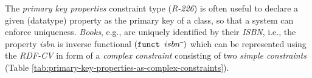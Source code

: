 \documentclass[a4paper,fontsize=11pt]{scrartcl}
\newcommand{\ms}[1]{\texttt{#1}}
\begin{document}
%
%
%
The \emph{primary key properties} constraint type (\emph{R-226}) is often useful to declare a given (datatype) property as the primary key of a class, so that a system can enforce uniqueness. 
\emph{Books}, e.g., are uniquely identified by their \emph{ISBN}, i.e., the property \emph{isbn} is inverse functional \ms{$(\ms{funct } isbn\sp{\overline{\ }})$}
which can be represented using the \emph{RDF-CV} in form of a \emph{complex constraint} consisting of two \emph{simple constraints} (Table \ref{tab:primary-key-properties-as-complex-constraints}).

\end{document}
